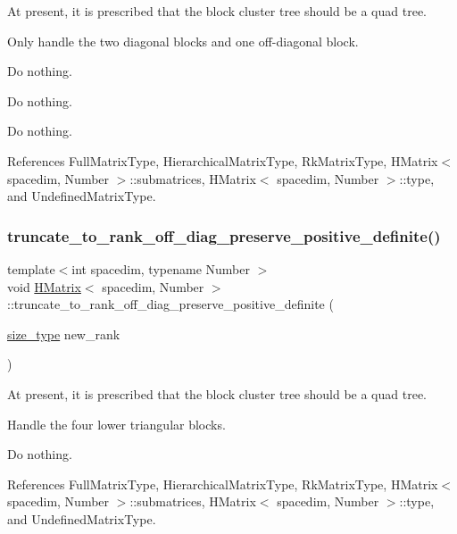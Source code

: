 At present, it is prescribed that the block cluster tree should be a quad tree.

Only handle the two diagonal blocks and one off-\/diagonal block.

Do nothing.

Do nothing.

Do nothing.

References Full\+Matrix\+Type, Hierarchical\+Matrix\+Type, Rk\+Matrix\+Type, H\+Matrix$<$ spacedim, Number $>$\+::submatrices, H\+Matrix$<$ spacedim, Number $>$\+::type, and Undefined\+Matrix\+Type.

\mbox{\label{classHMatrix_a58c40b6db50fe3dbbf230f951d346b9c}} 
\subsubsection{\texorpdfstring{truncate\+\_\+to\+\_\+rank\+\_\+off\+\_\+diag\+\_\+preserve\+\_\+positive\+\_\+definite()}{truncate\_to\_rank\_off\_diag\_preserve\_positive\_definite()}}
{\footnotesize\ttfamily template$<$int spacedim, typename Number $>$ \\
void \hyperlink{classHMatrix}{H\+Matrix}$<$ spacedim, Number $>$\+::truncate\+\_\+to\+\_\+rank\+\_\+off\+\_\+diag\+\_\+preserve\+\_\+positive\+\_\+definite (\begin{DoxyParamCaption}\item[{\hyperlink{classHMatrix_a5ca8dc549783d38371a01ecd621ecb34}{size\+\_\+type}}]{new\+\_\+rank }\end{DoxyParamCaption})}

At present, it is prescribed that the block cluster tree should be a quad tree.

Handle the four lower triangular blocks.

Do nothing.

References Full\+Matrix\+Type, Hierarchical\+Matrix\+Type, Rk\+Matrix\+Type, H\+Matrix$<$ spacedim, Number $>$\+::submatrices, H\+Matrix$<$ spacedim, Number $>$\+::type, and Undefined\+Matrix\+Type.

\mbox{\label{classHMatrix_a15191d30e94d5f54d30c5f612f606ce1}} 
